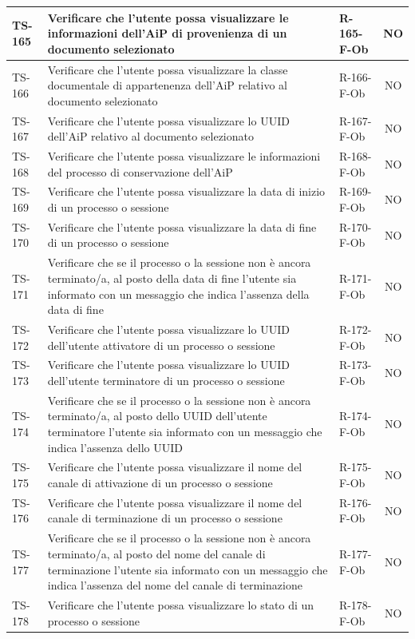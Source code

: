\documentclass[a4paper,12pt]{article}
\begin{document}
\begin{longtable}{|p{1.5cm}|p{8.3cm}|p{2.4cm}|c|}
\hline
TS-165 & Verificare che l'utente possa visualizzare le informazioni dell'AiP di provenienza di un documento selezionato & R-165-F-Ob & NO \\
\hline
TS-166 & Verificare che l'utente possa visualizzare la classe documentale di appartenenza dell'AiP relativo al documento selezionato & R-166-F-Ob & NO \\
\hline
TS-167 & Verificare che l'utente possa visualizzare lo UUID dell'AiP relativo al documento selezionato & R-167-F-Ob & NO \\
\hline
TS-168 & Verificare che l'utente possa visualizzare le informazioni del processo di conservazione dell'AiP & R-168-F-Ob & NO \\
\hline
TS-169 & Verificare che l'utente possa visualizzare la data di inizio di un processo o sessione & R-169-F-Ob & NO \\
\hline
TS-170 & Verificare che l'utente possa visualizzare la data di fine di un processo o sessione & R-170-F-Ob & NO \\
\hline
TS-171 & Verificare che se il processo o la sessione non è ancora terminato/a, al posto della data di fine l'utente sia informato con un messaggio che indica l'assenza della data di fine & R-171-F-Ob & NO \\
\hline
TS-172 & Verificare che l'utente possa visualizzare lo UUID dell'utente attivatore di un processo o sessione & R-172-F-Ob & NO \\
\hline
TS-173 & Verificare che l'utente possa visualizzare lo UUID dell'utente terminatore di un processo o sessione & R-173-F-Ob & NO \\
\hline
TS-174 & Verificare che se il processo o la sessione non è ancora terminato/a, al posto dello UUID dell'utente terminatore l'utente sia informato con un messaggio che indica l'assenza dello UUID & R-174-F-Ob & NO \\
\hline
TS-175 & Verificare che l'utente possa visualizzare il nome del canale di attivazione di un processo o sessione & R-175-F-Ob & NO \\
\hline
TS-176 & Verificare che l'utente possa visualizzare il nome del canale di terminazione di un processo o sessione & R-176-F-Ob & NO \\
\hline
TS-177 & Verificare che se il processo o la sessione non è ancora terminato/a, al posto del nome del canale di terminazione l'utente sia informato con un messaggio che indica l'assenza del nome del canale di terminazione & R-177-F-Ob & NO \\
\hline
TS-178 & Verificare che l'utente possa visualizzare lo stato di un processo o sessione & R-178-F-Ob & NO \\

\end{longtable}
\end{document}
